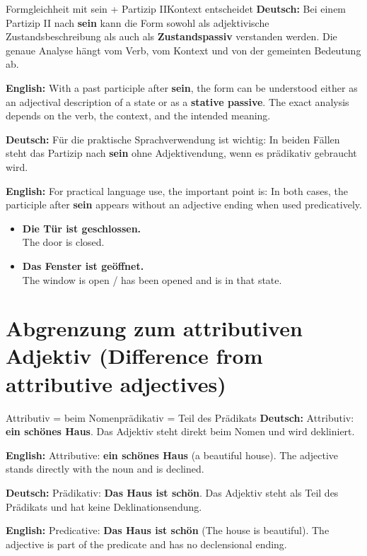 \documentclass[a4paper,11pt]{article}
\newcommand{\GermanText}[1]{\textbf{Deutsch: }#1\par}
\newcommand{\EnglishText}[1]{{\small\color{SoftGray}\textbf{English: }#1\par}}
\newcommand{\ExampleItem}[2]{\item \textbf{#1}\\{\small\color{SoftGray}#2}}
\begin{document}
        \begin{grammarentry}{Formgleichheit mit sein + Partizip II}{Kontext entscheidet}
            \GermanText{Bei einem Partizip II nach \textbf{sein} kann die Form sowohl als adjektivische Zustandsbeschreibung als auch als \textbf{Zustandspassiv} verstanden werden. Die genaue Analyse hängt vom Verb, vom Kontext und von der gemeinten Bedeutung ab.}
            \EnglishText{With a past participle after \textbf{sein}, the form can be understood either as an adjectival description of a state or as a \textbf{stative passive}. The exact analysis depends on the verb, the context, and the intended meaning.}

            \GermanText{Für die praktische Sprachverwendung ist wichtig: In beiden Fällen steht das Partizip nach \textbf{sein} ohne Adjektivendung, wenn es prädikativ gebraucht wird.}
            \EnglishText{For practical language use, the important point is: In both cases, the participle after \textbf{sein} appears without an adjective ending when used predicatively.}
        \end{grammarentry}

        \begin{exbox}
            \begin{itemize}
                \ExampleItem{Die Tür ist geschlossen.}{The door is closed.}
                \ExampleItem{Das Fenster ist geöffnet.}{The window is open / has been opened and is in that state.}
            \end{itemize}
        \end{exbox}

    \section{Abgrenzung zum attributiven Adjektiv \textnormal{(Difference from attributive adjectives)}}

        \begin{grammarentry}{Attributiv = beim Nomen}{prädikativ = Teil des Prädikats}
            \GermanText{Attributiv: \textbf{ein schönes Haus}. Das Adjektiv steht direkt beim Nomen und wird dekliniert.}
            \EnglishText{Attributive: \textbf{ein schönes Haus} (a beautiful house). The adjective stands directly with the noun and is declined.}

            \GermanText{Prädikativ: \textbf{Das Haus ist schön}. Das Adjektiv steht als Teil des Prädikats und hat keine Deklinationsendung.}
            \EnglishText{Predicative: \textbf{Das Haus ist schön} (The house is beautiful). The adjective is part of the predicate and has no declensional ending.}
        \end{grammarentry}
\end{document}
